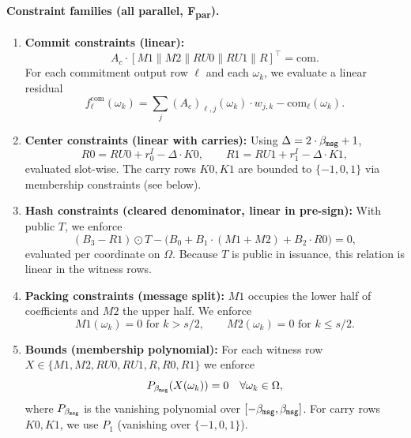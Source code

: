 
\paragraph{Constraint families (all parallel, F\textsubscript{par}).}
\begin{enumerate}
  \item \textbf{Commit constraints (linear):}
  \[
  A_c\cdot[M1\|M2\|RU0\|RU1\|R]^\top = \mathrm{com}.
  \]
  For each commitment output row $\ell$ and each $\omega_k$, we evaluate a linear residual
  \[
  f^{\mathrm{com}}_\ell(\omega_k)=\sum_j (A_c)_{\ell,j}(\omega_k)\cdot w_{j,k}-\mathrm{com}_\ell(\omega_k).
  \]

  \item \textbf{Center constraints (linear with carries):}
  Using $\Delta=2\cdot\beta_{\mathtt{msg}}+1$,
  \[
  R0 = RU0 + r^I_0 - \Delta\cdot K0,\qquad R1 = RU1 + r^I_1 - \Delta\cdot K1,
  \]
  evaluated slot-wise. The carry rows $K0,K1$ are bounded to $\{-1,0,1\}$ via membership constraints (see below).

  \item \textbf{Hash constraints (cleared denominator, linear in pre-sign):}
  With public $T$, we enforce
  \[
  (B_3 - R1)\odot T - \big(B_0 + B_1\cdot(M1{+}M2) + B_2\cdot R0\big)=0,
  \]
  evaluated per coordinate on $\Omega$. Because $T$ is public in issuance, this relation is linear in the witness rows.

  \item \textbf{Packing constraints (message split):}
  $M1$ occupies the lower half of coefficients and $M2$ the upper half. We enforce
  \[
  M1(\omega_k)=0 \text{ for } k> s/2,\qquad M2(\omega_k)=0 \text{ for } k\le s/2.
  \]

  \item \textbf{Bounds (membership polynomial):}
  For each witness row $X\in\{M1,M2,RU0,RU1,R,R0,R1\}$ we enforce
  \[
  P_{\beta_{\mathtt{msg}}}(X(\omega_k))=0\quad\forall \omega_k\in\Omega,
  \]
  where $P_{\beta_{\mathtt{msg}}}$ is the vanishing polynomial over $[-\beta_{\mathtt{msg}},\beta_{\mathtt{msg}}]$. For carry rows
  $K0,K1$, we use $P_1$ (vanishing over $\{-1,0,1\}$).
\end{enumerate}

